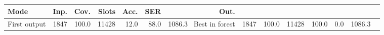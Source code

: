 \begin{tabular}{@{}lrrrrrr@{}}
\toprule
Mode & Inp. & Cov. & Slots & Acc. & SER & Out. \\
\midrule
First output & 1847 & 100.0 & 11428 & 12.0 & 88.0 & 1086.3 \
Best in forest & 1847 & 100.0 & 11428 & 100.0 & 0.0 & 1086.3 \
\bottomrule
\end{tabular}
